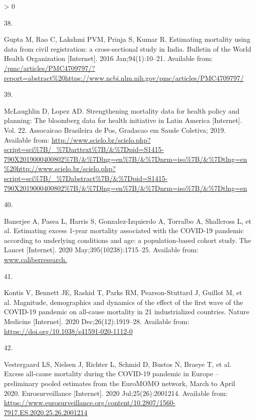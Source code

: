 \documentclass[
]{article}
\newlength{\cslhangindent}
\newlength{\csllabelwidth}
\newenvironment{CSLReferences}[2] %
 {%
  \setlength{\parindent}{0pt}
  \ifodd #1 \everypar{\setlength{\hangindent}{\cslhangindent}}\ignorespaces\fi
  \ifnum #2 > 0
  \setlength{\parskip}{#2\baselineskip}
  \fi
 }%
 {}
\newcommand{\CSLLeftMargin}[1]{\parbox[t]{\csllabelwidth}{#1}}
\newcommand{\CSLRightInline}[1]{\parbox[t]{\linewidth - \csllabelwidth}{#1}\break}
\begin{document}
\begin{CSLReferences}{0}{0}
\leavevmode\hypertarget{ref-Gupta2016}{}%
\CSLLeftMargin{38. }
\CSLRightInline{Gupta M, Rao C, Lakshmi PVM, Prinja S, Kumar R. {Estimating mortality using data from civil registration: a cross-sectional study in India}. Bulletin of the World Health Organization {[}Internet{]}. 2016 Jan;94(1):10--21. Available from: \url{/pmc/articles/PMC4709797/?report=abstract\%20https://www.ncbi.nlm.nih.gov/pmc/articles/PMC4709797/}}

\leavevmode\hypertarget{ref-McLaughlin2019}{}%
\CSLLeftMargin{39. }
\CSLRightInline{McLaughlin D, Lopez AD. {Strengthening mortality data for health policy and planning: The bloomberg data for health initiative in Latin America} {[}Internet{]}. Vol. 22. Assocaicao Brasileira de Pos, Gradacao em Saude Coletiva; 2019. Available from: \url{http://www.scielo.br/scielo.php?script=sci\%7B/_\%7Darttext\%7B/\&\%7Dpid=S1415-790X2019000400802\%7B/\&\%7Dlng=en\%7B/\&\%7Dnrm=iso\%7B/\&\%7Dtlng=en\%20http://www.scielo.br/scielo.php?script=sci\%7B/_\%7Dabstract\%7B/\&\%7Dpid=S1415-790X2019000400802\%7B/\&\%7Dlng=en\%7B/\&\%7Dnrm=iso\%7B/\&\%7Dtlng=en}}

\leavevmode\hypertarget{ref-Banerjee2020}{}%
\CSLLeftMargin{40. }
\CSLRightInline{Banerjee A, Pasea L, Harris S, Gonzalez-Izquierdo A, Torralbo A, Shallcross L, et al. {Estimating excess 1-year mortality associated with the COVID-19 pandemic according to underlying conditions and age: a population-based cohort study}. The Lancet {[}Internet{]}. 2020 May;395(10238):1715--25. Available from: \href{https://www.caliberresearch.}{www.caliberresearch.}}

\leavevmode\hypertarget{ref-Kontis2020}{}%
\CSLLeftMargin{41. }
\CSLRightInline{Kontis V, Bennett JE, Rashid T, Parks RM, Pearson-Stuttard J, Guillot M, et al. {Magnitude, demographics and dynamics of the effect of the first wave of the COVID-19 pandemic on all-cause mortality in 21 industrialized countries}. Nature Medicine {[}Internet{]}. 2020 Dec;26(12):1919--28. Available from: \url{https://doi.org/10.1038/s41591-020-1112-0}}

\leavevmode\hypertarget{ref-Vestergaard2020}{}%
\CSLLeftMargin{42. }
\CSLRightInline{Vestergaard LS, Nielsen J, Richter L, Schmid D, Bustos N, Braeye T, et al. {Excess all-cause mortality during the COVID-19 pandemic in Europe -- preliminary pooled estimates from the EuroMOMO network, March to April 2020}. Eurosurveillance {[}Internet{]}. 2020 Jul;25(26):2001214. Available from: \url{https://www.eurosurveillance.org/content/10.2807/1560-7917.ES.2020.25.26.2001214}}


\end{CSLReferences}
\end{document}
